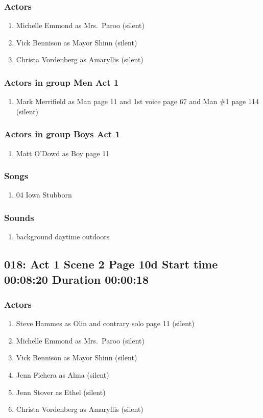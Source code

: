 \subsubsection{Actors}
\begin{enumerate}
\item Michelle Emmond as Mrs.~Paroo (silent)
\item Vick Bennison as Mayor Shinn (silent)
\item Christa Vordenberg as Amaryllis (silent)
\end{enumerate}
\subsubsection{Actors in group Men Act 1}
\begin{enumerate}
\item Mark Merrifield as Man page 11 and 1st voice page 67 and Man \#1 page 114 (silent)
\end{enumerate}
\subsubsection{Actors in group Boys Act 1}
\begin{enumerate}
\item Matt O'Dowd as Boy page 11
\end{enumerate}

\subsubsection{Songs}
\begin{enumerate}
\item 04 Iowa Stubborn
\end{enumerate}\subsubsection{Sounds}
\begin{enumerate}
\item background daytime outdoors
\end{enumerate}
\subsection{018: Act 1 Scene 2 Page 10d Start time 00:08:20 Duration 00:00:18}

\subsubsection{Actors}
\begin{enumerate}
\item Steve Hammes as Olin and contrary solo page 11 (silent)
\item Michelle Emmond as Mrs.~Paroo (silent)
\item Vick Bennison as Mayor Shinn (silent)
\item Jenn Fichera as Alma (silent)
\item Jenn Stover as Ethel (silent)
\item Christa Vordenberg as Amaryllis (silent)
\end{enumerate}

